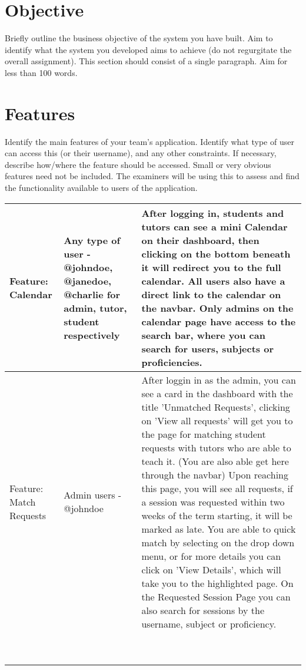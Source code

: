 \documentclass[11pt,a4paper]{article}
\begin{document}
\section*{Objective}
Briefly outline the business objective of the system you have built.  Aim to identify what the system you developed aims to achieve (do not regurgitate the overall assignment).  This section should consist of a single paragraph.  Aim for less than 100 words.


\section*{Features}
Identify the main features of your team's application.  Identify what type of user can access this (or their username), and any other constraints.  If necessary, describe how/where the feature should be accessed.  Small or very obvious features need not be included.  The examiners will be using this to assess and find the functionality available to users of the application.  

\begin{tabular}{|p{50mm}|p{40mm}|p{50mm}|}
\hline
Feature: Calendar & Any type of user - @johndoe, @janedoe, @charlie for admin, tutor, student respectively & After logging in, students and tutors can see a mini Calendar on their dashboard, then clicking on the bottom beneath it will redirect you to the full calendar. All users also have a direct link to the calendar on the navbar. Only admins on the calendar page have access to the search bar, where you can search for users, subjects or proficiencies. \\
\hline
Feature: Match Requests & Admin users - @johndoe & After loggin in as the admin, you can see a card in the dashboard with the title 'Unmatched Requests', clicking on 'View all requests' will get you to the page for matching student requests with tutors who are able to teach it. (You are also able get here through the navbar) Upon reaching this page, you will see all requests, if a session was requested within two weeks of the term starting, it will be marked as late. You are able to quick match by selecting on the drop down menu, or for more details you can click on 'View Details', which will take you to the highlighted page. On the Requested Session Page you can also search for sessions by the username, subject or proficiency.\\
 \hline
  & & \\
 \hline
  & & \\
 \hline
  & & \\
 \hline
  & & \\
 \hline
  & & \\
 \hline
  & & \\
 \hline
  & & \\
 \hline
  & & \\
 \hline
  & & \\
 \hline
\end{tabular}
\end{document}
